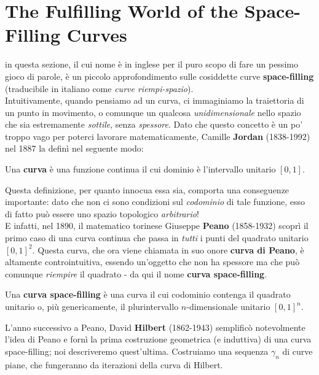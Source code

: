 \section{The Fulfilling World of the Space-Filling Curves}
in questa sezione, il cui nome è in inglese per il puro scopo di fare un pessimo gioco di parole, è un piccolo approfondimento sulle cosiddette curve \textbf{space-filling} (traducibile in italiano come \textit{curve riempi-spazio}).\\
Intuitivamente, quando pensiamo ad un curva, ci immaginiamo la traiettoria di un punto in movimento, o comunque un qualcosa \textit{unidimensionale} nello spazio che sia estremamente \textit{sottile}, senza \textit{spessore}. Dato che questo concetto è un po' troppo vago per poterci lavorare matematicamente, Camille \textbf{Jordan} (1838-1992) nel 1887 la definì nel seguente modo:
\begin{define}[Curva]
	Una \textbf{curva} è una funzione continua il cui dominio è l'intervallo unitario $\left[0,1\right]$.
\end{define}
Questa definizione, per quanto innocua essa sia, comporta una conseguenze importante: dato che non ci sono condizioni sul \textit{codominio} di tale funzione, esso di fatto può essere uno spazio topologico \textit{arbitrario}!\\
E infatti, nel 1890, il matematico torinese Giuseppe \textbf{Peano} (1858-1932) scoprì il primo caso di una curva continua che passa in \textit{tutti} i punti del quadrato unitario $\left[0,1\right]^2$. Questa curva, che ora viene chiamata in suo onore \textbf{curva di Peano}, è altamente controintuitiva, essendo un'oggetto che non ha spessore ma che può comunque \textit{riempire} il quadrato - da qui il nome \textbf{curva space-filling}.
\begin{define}
	Una \textbf{curva space-filling} è una curva il cui codominio contenga il quadrato unitario o, più genericamente, il plurintervallo $n$-dimensionale unitario $\left[0,1\right]^n$.
\end{define}
L'anno successivo a Peano, David \textbf{Hilbert} (1862-1943) semplificò notevolmente l'idea di Peano e fornì la prima costruzione geometrica (e induttiva) di una curva space-filling; noi descriveremo quest'ultima. Costruiamo una sequenza $\gamma_n$ di curve piane, che fungeranno da iterazioni della curva di Hilbert.
